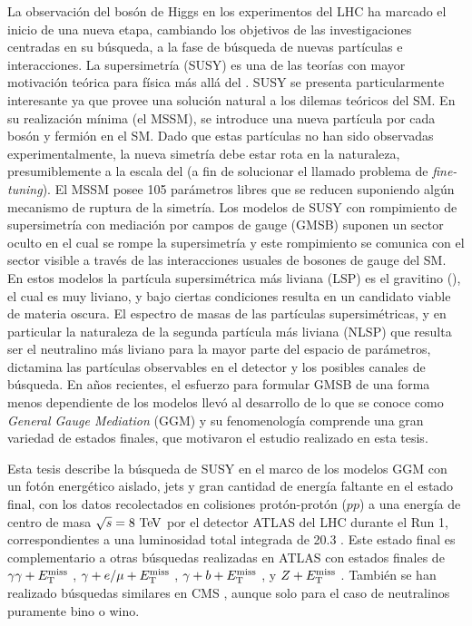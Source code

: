 La observación del bosón de Higgs en los experimentos del LHC ha marcado el inicio de una
nueva etapa, cambiando los objetivos de las investigaciones centradas en su búsqueda, a la
fase de búsqueda de nuevas partículas e interacciones.
La supersimetría (SUSY)
\cite{Miyazawa:1966,Ramond:1971gb,Golfand:1971iw,Neveu:1971rx,Neveu:1971iv,Gervais:1971ji,Volkov:1973ix,Wess:1973kz,Wess:1974tw}
es una de las teorías con mayor motivación teórica para física más allá del
{\SM}. SUSY se presenta particularmente interesante ya que provee una
solución natural a los dilemas teóricos del SM.
En su realización mínima (el MSSM), se introduce
una nueva partícula por cada bosón y fermión en el SM. Dado que
estas partículas no han sido observadas experimentalmente, la nueva simetría debe
estar rota en la naturaleza, presumiblemente a la escala del {\tev} (a fin de solucionar el
llamado problema de \emph{fine-tuning}). El MSSM posee
105 parámetros libres que se reducen suponiendo algún mecanismo de ruptura de la simetría.
Los modelos de SUSY con rompimiento de supersimetría con
mediación por campos de gauge (GMSB)
\cite{Dine:1981gu,AlvarezGaume:1981wy,Nappi:1982hm,Dine:1993yw,Dine:1994vc,Dine:1995ag}
suponen un sector oculto en el cual se rompe la supersimetría y este rompimiento
se comunica con el sector visible a través de las interacciones
usuales de bosones de gauge del SM. En estos modelos la partícula supersimétrica más liviana
(LSP) es el gravitino (\gravino), el cual es muy liviano, y
bajo ciertas condiciones resulta en un candidato viable de materia oscura. El
espectro de masas de las partículas supersimétricas, y en particular
la naturaleza de la segunda partícula más liviana (NLSP) que resulta ser el
neutralino más liviano {\ninoone} para la mayor parte del espacio de parámetros,
dictamina las partículas observables en el detector y los posibles canales
de búsqueda.
En a\~nos recientes, el esfuerzo para formular GMSB de una
forma menos dependiente de los modelos llevó al desarrollo de lo que se conoce
como \emph{General Gauge Mediation} (GGM) \cite{GGM} y su fenomenología comprende
una gran variedad de estados finales, que motivaron el estudio realizado en esta
tesis.

Esta tesis describe la búsqueda de SUSY en el marco de los modelos GGM con
un fotón energético aislado, jets
y gran cantidad de energía faltante en el estado final, con los datos recolectados en colisiones
protón-protón ($pp$)
a una energía de centro de masa $\sqrt{s} = 8 \tev$ por el detector
ATLAS del LHC durante el Run 1, correspondientes a una luminosidad total
integrada de 20.3 \ifb. Este estado final es complementario a otras búsquedas
realizadas en ATLAS con estados finales de $\gamma\gamma+E_{\mathrm{T}}^{\mathrm{miss}}$ \cite{Aad2012519,ATLAS-CONF-2014-001},
$\gamma+e/\mu+E_{\mathrm{T}}^{\mathrm{miss}}$ \cite{ATLAS-CONF-2012-144}, $\gamma+b+E_{\mathrm{T}}^{\mathrm{miss}}$
\cite{Aad:2012jva}, y $Z+E_{\mathrm{T}}^{\mathrm{miss}}$ \cite{ATLAS-CONF-2012-152}.
También se han realizado búsquedas similares en CMS \cite{CMS-PAS-SUS-12-018,CMS-PAS-SUS-14-004},
aunque solo para el caso de neutralinos puramente bino o wino.


